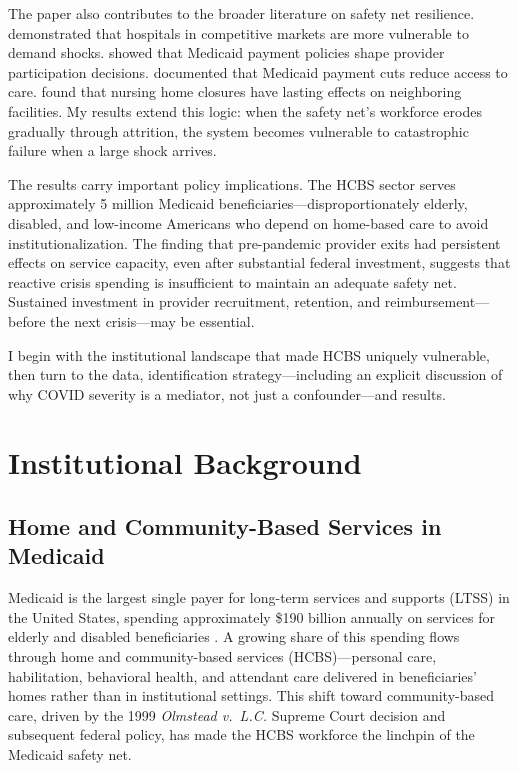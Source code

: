 \documentclass[12pt]{article}
\begin{document}
The paper also contributes to the broader literature on safety net resilience. \citet{dranove2000} demonstrated that hospitals in competitive markets are more vulnerable to demand shocks. \citet{duggan2000} showed that Medicaid payment policies shape provider participation decisions. \citet{gruber2005} documented that Medicaid payment cuts reduce access to care. \citet{alexander2020} found that nursing home closures have lasting effects on neighboring facilities. My results extend this logic: when the safety net's workforce erodes gradually through attrition, the system becomes vulnerable to catastrophic failure when a large shock arrives.

The results carry important policy implications. The HCBS sector serves approximately 5 million Medicaid beneficiaries---disproportionately elderly, disabled, and low-income Americans who depend on home-based care to avoid institutionalization. The finding that pre-pandemic provider exits had persistent effects on service capacity, even after substantial federal investment, suggests that reactive crisis spending is insufficient to maintain an adequate safety net. Sustained investment in provider recruitment, retention, and reimbursement---before the next crisis---may be essential.

I begin with the institutional landscape that made HCBS uniquely vulnerable, then turn to the data, identification strategy---including an explicit discussion of why COVID severity is a mediator, not just a confounder---and results.


\section{Institutional Background}

\subsection{Home and Community-Based Services in Medicaid}

Medicaid is the largest single payer for long-term services and supports (LTSS) in the United States, spending approximately \$190 billion annually on services for elderly and disabled beneficiaries \citep{cms2024medicaid}. A growing share of this spending flows through home and community-based services (HCBS)---personal care, habilitation, behavioral health, and attendant care delivered in beneficiaries' homes rather than in institutional settings. This shift toward community-based care, driven by the 1999 \emph{Olmstead v.\ L.C.} Supreme Court decision and subsequent federal policy, has made the HCBS workforce the linchpin of the Medicaid safety net.
\end{document}
